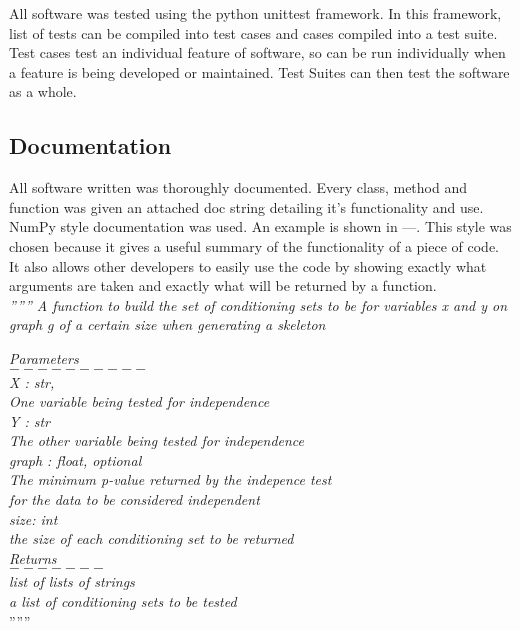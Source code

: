 \documentclass{article}
\begin{document}
All software was tested using the python unittest framework. In this framework, list of tests can be compiled into test cases and cases compiled into a test suite. Test cases test an individual feature of software, so can be run individually when a feature is being developed or maintained. Test Suites can then test the software as a whole.\\

\subsection{Documentation}
All software written was thoroughly documented. Every class, method and function was given an attached doc string detailing it's functionality and use.\\

NumPy style documentation was used. An example is shown in ---. This style was chosen because it gives a useful summary of the functionality of a piece of code. It also allows other developers to easily use the code by showing exactly what arguments are taken and exactly what will be returned by a function.\\

\textit{ '''''' A  function to build the set of conditioning sets to be for variables x and y
	on graph g of a certain size when generating a skeleton\\}

\textit{Parameters\\
	$ 	---------- $\\
	X : str, \\
	One variable being tested for independence\\ 
	Y : str\\
	The other variable being tested for independence\\
	graph : float, optional\\
	The minimum p-value returned by the indepence test\\
	for the data to be considered independent\\
	size: int\\
	the size of each conditioning set to be returned\\
	Returns\\
	$ ------- $\\
	list of lists of strings\\
	a list of conditioning sets to be tested\\}
''''''\\
\end{document}
